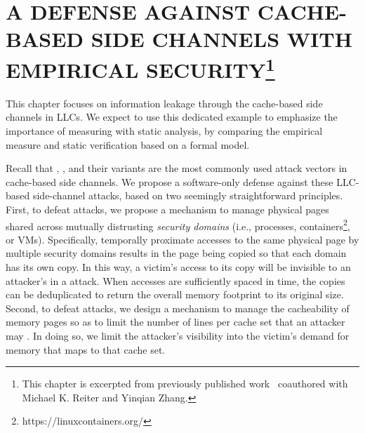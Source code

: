 \graphicspath{{./}{./fig/}{./fig/cachebar/}}
\chapter[\uppercase{A defense against cache-based
side channels with empirical security}]{\uppercase{A defense against cache-based
side channels with empirical security}\protect\footnote{This chapter is excerpted from previously
published work~\cite{cachebar} coauthored with Michael K. Reiter and
Yinqian Zhang.}}
\label{chap:cachebar}
This chapter focuses on information leakage through the cache-based
side channels in \glspl{LLC}. We expect to use this dedicated example
to emphasize the importance of measuring with static analysis, by
comparing the empirical measure and static verification based on a
formal model.

Recall that \flushreload, \primeprobe,
and their variants are the most commonly used attack vectors in
cache-based side channels. We propose a software-only defense against
these \gls{LLC}-based side-channel attacks, based on two seemingly
straightforward principles. First, to defeat \flushreload attacks, we
propose a \coa mechanism to manage physical pages shared across
mutually distrusting \textit{security domains} (i.e., processes,
containers\footnote{https://linuxcontainers.org/}, or \glspl{VM}).
Specifically, temporally proximate accesses to the same physical page
by multiple security domains results in the page being copied so that
each domain has its own copy.  In this way, a victim's access to its
copy will be invisible to an attacker's \Reload in a \flushreload
attack. When accesses are sufficiently spaced in time, the copies can
be deduplicated to return the overall memory footprint to its original
size. Second, to defeat \primeprobe attacks, we design a mechanism to
manage the cacheability of memory pages so as to limit the number of
lines per cache set that an attacker may \Probe. In doing so, we limit
the attacker's visibility into the victim's demand for memory that
maps to that cache set.  


